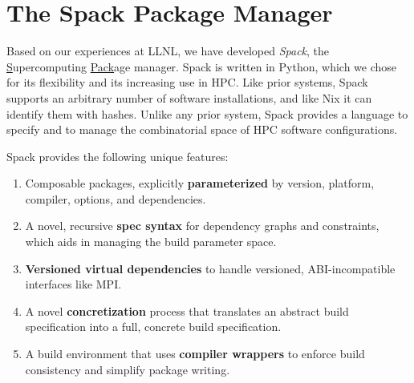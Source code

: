 
\section{The Spack Package Manager}
\label{sec:implementation}
Based on our experiences at LLNL, we have developed
{\it Spack}, the \underline{S}upercomputing \underline{Pack}age manager.
Spack is written in Python, which we chose for its flexibility
and its increasing use in HPC.
%
Like prior systems, Spack supports an arbitrary number of software
installations, and like Nix it can identify them with hashes.  Unlike any
prior system, Spack provides a language to specify and to manage the
combinatorial space of HPC software configurations.

\noindent
Spack provides the following unique features:
\begin{enumerate}
\item Composable packages, explicitly {\bf parameterized} by version, platform,
      compiler, options, and dependencies.
\item A novel, recursive {\bf spec syntax} for dependency graphs and constraints,
      which aids in managing the build parameter space.
\item {\bf Versioned virtual dependencies} to handle versioned, 
      ABI-incompatible interfaces like MPI.
\item A novel {\bf concretization} process that translates an abstract build
      specification into a full, concrete build specification.
\item A build environment that uses {\bf compiler wrappers} to enforce build
      consistency and simplify package writing.
\end{enumerate}






